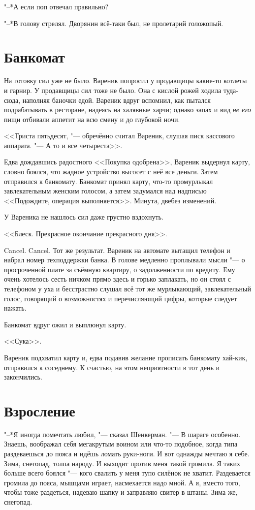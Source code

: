 "--*А если поп отвечал правильно?

"--*В голову стрелял.
Дворянин всё-таки был, не пролетарий голожопый.

\section{Банкомат}

На готовку сил уже не было.
Вареник попросил у продавщицы какие-то котлеты и гарнир.
У продавщицы сил тоже не было.
Она с кислой рожей ходила туда-сюда, наполняя баночки едой.
Вареник вдруг вспомнил, как пытался подрабатывать в ресторане, надеясь на халявные харчи;
однако запах и вид \emph{не его} пищи отбивали аппетит на всю смену и до глубокой ночи. 

<<Триста пятьдесят, "--- обречённо считал Вареник, слушая писк кассового аппарата.
"--- А то и все четыреста>>.

Едва дождавшись радостного <<Покупка одобрена>>, Вареник выдернул карту, словно боялся, что жадное устройство высосет с неё все деньги.
Затем отправился к банкомату.
Банкомат принял карту, что-то промурлыкал завлекательным женским голосом, а затем задумался над надписью <<Подождите, операция выполняется>>.
Минута, две\ldotst без изменений.

У Вареника не нашлось сил даже грустно вздохнуть.

<<Блеск.
Прекрасное окончание прекрасного дня>>.

Cancel. Cancel.
Тот же результат.
Вареник на автомате вытащил телефон и набрал номер техподдержки банка.
В голове медленно проплывали мысли "--- о просроченной плате за съёмную квартиру, о задолженности по кредиту.
Ему очень хотелось сесть ничком прямо здесь и горько заплакать, но он стоял с телефоном у уха и бесстрастно слушал всё тот же мурлыкающий, завлекательный голос, говорящий о возможностях и перечисляющий цифры, которые следует нажать.

Банкомат вдруг ожил и выплюнул карту.

<<Сука>>.

Вареник подхватил карту и, едва подавив желание прописать банкомату хай-кик, отправился к соседнему.
К счастью, на этом неприятности в тот день и закончились.

\section{Взросление}

"--*Я иногда помечтать любил, "--- сказал Шенкерман.
"--- В шараге особенно. 
Знаешь, воображал себя мегакрутым воином или что-то подобное, когда типа раздеваешься до пояса и идёшь ломать руки-ноги.
И вот однажды мечтаю я себе.
Зима, снегопад, толпа народу.
И выходит против меня такой громила.
Я таких больше всего боялся "--- кого свалить у меня тупо силёнок не хватит.
Раздевается громила до пояса, мышцами играет, насмехается надо мной.
А я, вместо того, чтобы тоже раздеться, надеваю шапку и заправляю свитер в штаны.
Зима же, снегопад.

